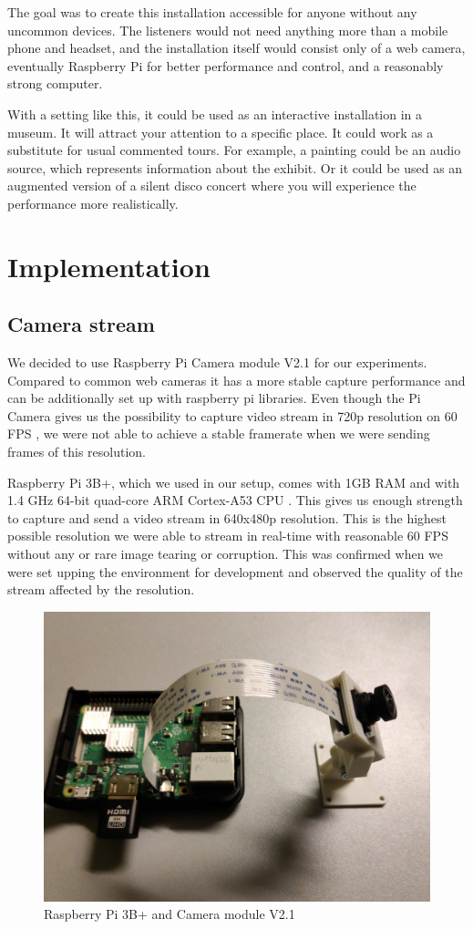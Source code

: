 \documentclass{ctuthesis}
\begin{document}
The goal was to create this installation accessible for anyone without any uncommon devices. The listeners would not need anything more than a mobile phone and headset, and the installation itself would consist only of a web camera, eventually Raspberry Pi for better performance and control, and a reasonably strong computer. 

With a setting like this, it could be used as an interactive installation in a museum. It will attract your attention to a specific place. It could work as a substitute for usual commented tours. For example, a painting could be an audio source, which represents information about the exhibit. 
Or it could be used as an augmented version of a silent disco concert where you will experience the performance more realistically.




\chapter{Implementation}
\section{Camera stream} \label {camera}
We decided to use Raspberry Pi Camera module V2.1 for our experiments. Compared to common web cameras it has a more stable capture performance and can be additionally set up with raspberry pi libraries. Even though the Pi Camera gives us the possibility to capture video stream in 720p resolution on 60 FPS \cite{2}, we were not able to achieve a stable framerate when we were sending frames of this resolution.

Raspberry Pi 3B+, which we used in our setup, comes with 1GB RAM and with 1.4 GHz 64-bit quad-core ARM Cortex-A53 CPU \cite{1}. This gives us enough strength to capture and send a video stream in 640x480p resolution. This is the highest possible resolution we were able to stream in real-time with reasonable 60 FPS without any or rare image tearing or corruption. This was confirmed when we were set upping the environment for development and observed the quality of the stream affected by the resolution.



\begin{figure}[H]
	\centering
	\includegraphics[width=0.8\linewidth]{rPi.jpeg}
	\caption{Raspberry Pi 3B+ and Camera module V2.1}
	\label{fig:raspberry}
\end{figure}
\end{document}
